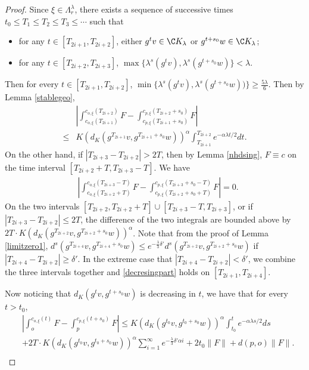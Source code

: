 \documentclass[11pt]{amsart}
\theoremstyle{definition}
\def\a{\alpha}
\def\d{\delta}   %
\def\l{\lambda}   \def\L{\Lambda}
\begin{document}
\begin{proof}
Since $\xi\in \L_r^\l$, there exists a sequence of successive times $t_0\le T_1\le T_2\le T_3\le \cdots$ such that 
\begin{itemize}
    \item for any $t\in [T_{2i+1},T_{2i+2}]$, either $g^tv\in \C K_\l$ or $g^{t+s_0}w\in \C K_\l$;
    \item  for any $t\in [T_{2i+2},T_{2i+3}]$, $\max\{\l^s(g^tv), \l^s(g^{t+s_0}w)\}<\l$.
\end{itemize}
Then for every $t\in [T_{2i+1},T_{2i+2}]$, $\min\{\l^s(g^{t}v),\l^s(g^{t+s_0}w))\}\ge \frac{5\l}{6}$. Then by Lemma \ref{stablegeo},
\begin{equation}\label{decresingpart}
    \begin{aligned}
&\left|\int_{c_{o,\xi}(T_{2i+1})}^{c_{o,\xi}(T_{2i+2})}F-\int_{c_{p,\xi}(T_{2i+1}+s_0)}^{c_{p,\xi}(T_{2i+2}+s_0)}F\right|\\
\le &K(d_K(g^{T_{2i+1}}v, g^{T_{2i+1}+s_0}w))^\a \int_{T_{2i+1}}^{T_{2i+2}}e^{-\a\l t/2}dt.        
    \end{aligned}
\end{equation}
On the other hand, if $|T_{2i+3}-T_{2i+2}|>2T$, then by Lemma \ref{nhdsing}, $F\equiv c$ on the time interval $[T_{2i+2}+T, T_{2i+3}-T]$. We have 
\begin{equation}\label{constantpart}
    \begin{aligned}
&\left|\int_{c_{o,\xi}(T_{2i+2}+T)}^{c_{o,\xi}(T_{2i+3}-T)}F-\int_{c_{p,\xi}(T_{2i+2}+s_0+T)}^{c_{p,\xi}(T_{2i+3}+s_0-T)}F\right|=0.
    \end{aligned}
\end{equation}
On the two intervals $[T_{2i+2}, T_{2i+2}+T]\cup [T_{2i+3}-T, T_{2i+3}]$, or if $|T_{2i+3}-T_{2i+2}|\le 2T$, the difference of the two integrals are bounded above by $2T\cdot K(d_K(g^{T_{2i+2}}v, g^{T_{2i+2}+s_0}w))^\a$. Note that from the proof of Lemma \ref{limitzero1}, $d^s(g^{T_{2i+4}}v, g^{T_{2i+4}+s_0}w)\le e^{-\frac{\l}{3}\d'}d^s(g^{T_{2i+2}}v, g^{T_{2i+2}+s_0}w)$ if $|T_{2i+4}-T_{2i+2}|\ge \d'$. In the extreme case that $|T_{2i+4}-T_{2i+2}|< \d'$, we combine the three intervals together and \eqref{decresingpart} holds on $[T_{2i+1}, T_{2i+4}]$.

Now noticing that  $d_K(g^{t}v, g^{t+s_0}w)$ is decreasing in $t$, we have that for every $t>t_0$,
\begin{equation}\label{total}
    \begin{aligned}
&\left|\int_{o}^{c_{o,\xi}(t)}F-\int_{p}^{c_{p,\xi}(t+s_0)}F\right|\le K(d_K(g^{t_0}v, g^{t_{0}+s_0}w))^\a\int_{t_0}^te^{-\a\l s/2}ds\\
&+2T\cdot K(d_K(g^{t_0}v, g^{t_{0}+s_0}w))^\a\sum_{i=1}^\infty e^{-\frac{\l}{3}\d'\a i}+2t_0\|F\|+d(p,o)\|F\|.\\
    \end{aligned}
\end{equation}


\end{proof}
\end{document}
